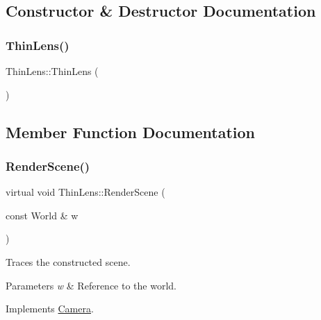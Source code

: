 \subsection{Constructor \& Destructor Documentation}
\hypertarget{class_thin_lens_ae458cc9405f705ec7c8cbffca08e23b2}{}\label{class_thin_lens_ae458cc9405f705ec7c8cbffca08e23b2} 
\subsubsection{\texorpdfstring{Thin\+Lens()}{ThinLens()}}
{\footnotesize\ttfamily Thin\+Lens\+::\+Thin\+Lens (\begin{DoxyParamCaption}{ }\end{DoxyParamCaption})}



\subsection{Member Function Documentation}
\hypertarget{class_thin_lens_af33d499e8fdbdbd196ba3a9b28bdaf5c}{}\label{class_thin_lens_af33d499e8fdbdbd196ba3a9b28bdaf5c} 
\subsubsection{\texorpdfstring{Render\+Scene()}{RenderScene()}}
{\footnotesize\ttfamily virtual void Thin\+Lens\+::\+Render\+Scene (\begin{DoxyParamCaption}\item[{const World \&}]{w }\end{DoxyParamCaption})\hspace{0.3cm}{\ttfamily [virtual]}}

Traces the constructed scene. 
\begin{DoxyParams}{Parameters}
{\em w} & Reference to the world. \\
\hline
\end{DoxyParams}


Implements \hyperlink{class_camera_ad65367e9b225387219d013ffed3f621a}{Camera}.

\hypertarget{class_thin_lens_a8b14ebeb4fd25147301eba27d8a5530d}{}\label{class_thin_lens_a8b14ebeb4fd25147301eba27d8a5530d} 
